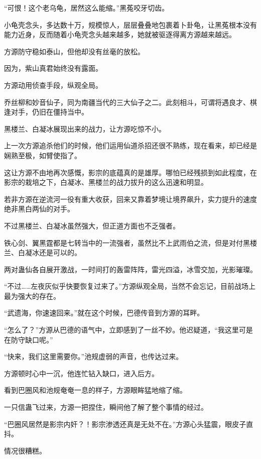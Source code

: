 
\begin{this_body}

“可恨！这个老乌龟，居然这么能缩。”黑菟咬牙切齿。

小龟壳念头，多达数十万，规模惊人，层层叠叠地包裹着卜卦龟，让黑菟根本没有能力近身，反而随着小龟壳念头越来越多，她就被驱逐得离方源越来越远。

方源防守稳如泰山，但他却没有丝毫的放松。

因为，紫山真君始终没有露面。

方源动用侦查手段，纵观全局。

乔丝柳和妙音仙子，同为南疆当代的三大仙子之二。此刻相斗，可谓将遇良才、棋逢对手，仍旧在僵持当中。

黑楼兰、白凝冰展现出来的战力，让方源吃惊不小。

上一次方源追杀他们的时候，他们运用仙道杀招还很不熟练，现在看来，却已经是娴熟至极，如臂使指了。

这让方源不由地再次感慨，影宗的底蕴真的是雄厚。哪怕已经残损到如此程度，在影宗的栽培之下，白凝冰、黑楼兰的战力拔升的这么迅速和明显。

若非方源在逆流河一役有重大收获，回来又靠着梦境让境界飙升，实力提升的速度绝非黑白两仙的对手。

不过黑楼兰、白凝冰虽然强大，但正道方面也不乏强者。

铁心剑、翼黑霆都是七转当中的一流强者，虽然比不上武雨伯之流，但是对付黑楼兰、白凝冰还是可以的。

两对蛊仙各自展开激战，一时间打的轰雷阵阵，雷光四溢，冰雪交加，光影璀璨。

“不过……左夜灰似乎快要恢复过来了。”方源纵观全局，当然不会忘记，目前战场上最为强大的存在。

“武遗海，你速速回来。”就在这个时候，巴德传音到方源的耳畔。

“怎么了？”方源从巴德的语气中，立即感到了一丝不妙。他迟疑道，“我这里可是在防守缺口呢。”

“快来，我们这里需要你。”池规虚弱的声音，也传达过来。

方源顿时心中一沉，他连忙钻入缺口，进入后方。

看到巴圈风和池规奄奄一息的样子，方源眼眸猛地缩了缩。

一只信蛊飞过来，方源一把捏住，瞬间他了解了整个事情的经过。

“巴圈风居然是影宗内奸？！影宗渗透还真是无处不在。”方源心头猛震，眼皮子直抖。

情况很糟糕。


\end{this_body}

